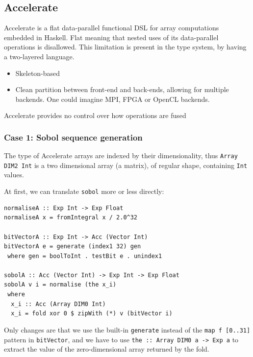 \documentclass[preprint]{sigplanconf}
\begin{document}
\subsection{Accelerate}
Accelerate is a flat data-parallel functional DSL for array
computations embedded in Haskell. Flat meaning that nested uses of its
data-parallel operations is disallowed. This limitation is present in
the type system, by having a two-layered language. 

\begin{itemize}
\item Skeleton-based
\item Clean partition between front-end and back-ends, allowing for
  multiple backends. One could imagine MPI, FPGA or OpenCL backends.
\end{itemize}

Accelerate provides no control over how operations are fused

\subsubsection{Case 1: Sobol sequence generation}
The type of Accelerate arrays are indexed by their dimensionality,
thus \verb|Array DIM2 Int| is a two dimensional array (a matrix),
of regular shape, containing \verb|Int| values. 

At first, we can translate \verb|sobol| more or less directly:
\begin{verbatim}
normaliseA :: Exp Int -> Exp Float
normaliseA x = fromIntegral x / 2.0^32

bitVectorA :: Exp Int -> Acc (Vector Int)
bitVectorA e = generate (index1 32) gen
 where gen = boolToInt . testBit e . unindex1

sobolA :: Acc (Vector Int) -> Exp Int -> Exp Float
sobolA v i = normalise (the x_i)
 where
  x_i :: Acc (Array DIM0 Int)
  x_i = fold xor 0 $ zipWith (*) v (bitVector i)
\end{verbatim}
Only changes are that we use the built-in \verb|generate| instead of
the \verb|map f [0..31]| pattern in \verb|bitVector|, and we have to
use \verb|the :: Array DIM0 a -> Exp a| to extract the value of the
zero-dimensional array returned by the fold.
\end{document}
